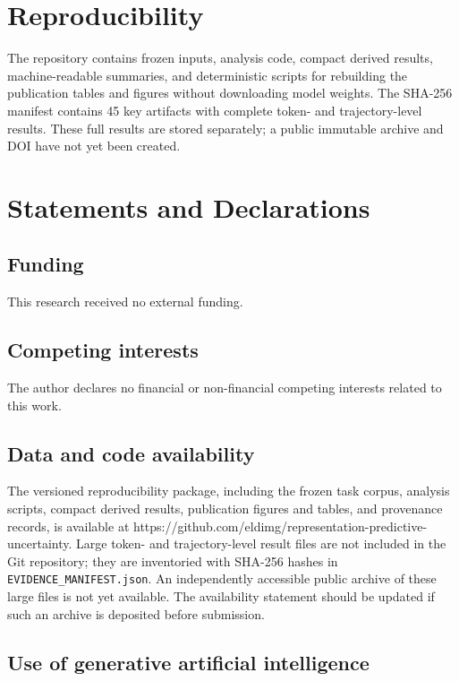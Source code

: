 \documentclass[sn-mathphys-num]{sn-jnl}
\begin{document}
\section{Reproducibility}

The repository contains frozen inputs, analysis code, compact derived results, machine-readable summaries, and deterministic scripts for rebuilding the publication tables and figures without downloading model weights. The SHA-256 manifest contains 45 key artifacts with complete token- and trajectory-level results. These full results are stored separately; a public immutable archive and DOI have not yet been created.

\section*{Statements and Declarations}

\subsection*{Funding}

This research received no external funding.

\subsection*{Competing interests}

The author declares no financial or non-financial competing interests related to this work.

\subsection*{Data and code availability}

The versioned reproducibility package, including the frozen task corpus, analysis scripts, compact derived results, publication figures and tables, and provenance records, is available at https://github.com/eldimg/representation-predictive-uncertainty. Large token- and trajectory-level result files are not included in the Git repository; they are inventoried with SHA-256 hashes in \texttt{EVIDENCE\_MANIFEST.json}. An independently accessible public archive of these large files is not yet available. The availability statement should be updated if such an archive is deposited before submission.

\subsection*{Use of generative artificial intelligence}
\end{document}
